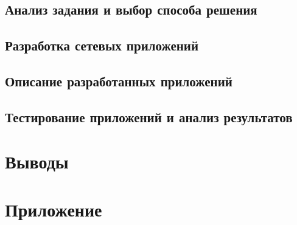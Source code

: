 \subsection{Анализ задания и выбор способа решения}


\subsection{Разработка сетевых приложений}


\subsection{Описание разработанных приложений}


\subsection{Тестирование приложений и анализ результатов}


\section{Выводы}


\newpage

\section*{Приложение}



